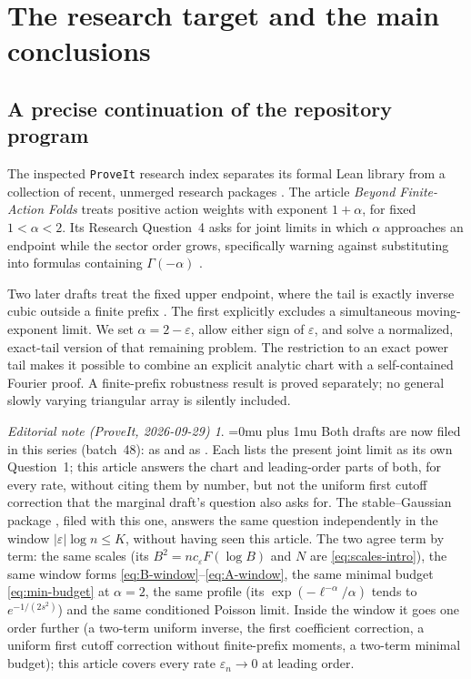 \documentclass[11pt,a4paper]{article}
\numberwithin{equation}{section}
\theoremstyle{definition}
\theoremstyle{remark}
\newtheorem*{ednoteinner}{Editorial note (ProveIt, 2026-09-29)}
\newenvironment{ednote}{\begin{ednoteinner}\sloppy\Urlmuskip=0mu plus 1mu\relax}{\end{ednoteinner}}
\newcommand{\eps}{\varepsilon}
\begin{document}
\clearpage
\begingroup\small\setlength{\parskip}{0pt}\tableofcontents\endgroup
\clearpage

\section{The research target and the main conclusions}
\label{sec:intro}

\subsection{A precise continuation of the repository program}
The inspected \texttt{ProveIt} research index separates its formal Lean library
from a collection of recent, unmerged research packages \cite{repo-index}.
The article \emph{Beyond Finite-Action Folds} treats positive action weights
with exponent \(1+\alpha\), for fixed \(1<\alpha<2\). Its Research Question~4
asks for joint limits in which \(\alpha\) approaches an endpoint while the
sector order grows, specifically warning against substituting into formulas
containing \(\Gamma(-\alpha)\) \cite{repo-stable}.

Two later drafts treat the fixed upper endpoint, where the tail is exactly
inverse cubic outside a finite prefix \cite{prior-endpoint,prior-marginal}.
The first explicitly excludes a simultaneous moving-exponent limit. We set
\(\alpha=2-\eps\), allow either sign of \(\eps\), and solve a normalized,
exact-tail version of that remaining problem. The restriction to an exact
power tail makes it possible to combine an explicit analytic chart with a
self-contained Fourier proof. A finite-prefix robustness result is proved
separately; no general slowly varying triangular array is silently included.

\begin{ednote}
Both drafts are now filed in this series (batch~48): \cite{prior-endpoint}
as  and
\cite{prior-marginal} as .
Each lists the present joint limit as its own Question~1; this article
answers the chart and leading-order parts of both, for every rate, without
citing them by number, but not the uniform first cutoff correction that the
marginal draft's question also asks for. The stable--Gaussian package \cite{ed:sge}, filed with this one,
answers the same question independently in the window
\(|\eps|\log n\le K\), without having seen this article. The two agree term
by term: the same scales (its \(B^2=nc_\eps F(\log B)\) and \(N\) are
\eqref{eq:scales-intro}), the same window forms
\eqref{eq:B-window}--\eqref{eq:A-window}, the same minimal budget
\eqref{eq:min-budget} at \(\alpha=2\), the same profile (its
\(\exp(-\ell^{-\alpha}/\alpha)\) tends to \(e^{-1/(2s^2)}\)) and the same
conditioned Poisson limit. Inside the window it goes one order further (a
two-term uniform inverse, the first coefficient correction, a uniform first
cutoff correction without finite-prefix moments, a two-term minimal
budget); this article covers every rate \(\eps_n\to0\) at leading order.
\end{ednote}
\end{document}
